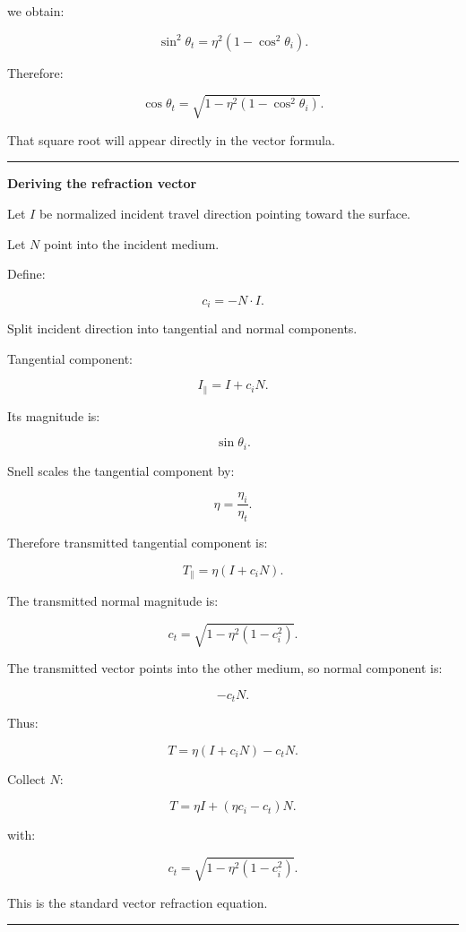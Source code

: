 we obtain:

\[
\sin^2\theta_t
=
\eta^2
(1-\cos^2\theta_i).
\]

Therefore:

\[
\boxed{
\cos\theta_t
=
\sqrt{
1-
\eta^2
(1-\cos^2\theta_i)
}.
}
\]

That square root will appear directly in the vector formula.

\begin{center}\rule{0.5\linewidth}{0.5pt}\end{center}

\textbf{Deriving the refraction vector}

Let \(I\) be normalized incident travel direction pointing toward the surface.

Let \(N\) point into the incident medium.

Define:

\[
c_i=-N\cdot I.
\]

Split incident direction into tangential and normal components.

Tangential component:

\[
I_\parallel
=
I+c_iN.
\]

Its magnitude is:

\[
\sin\theta_i.
\]

Snell scales the tangential component by:

\[
\eta=\frac{\eta_i}{\eta_t}.
\]

Therefore transmitted tangential component is:

\[
T_\parallel=
\eta(I+c_iN).
\]

The transmitted normal magnitude is:

\[
c_t=
\sqrt{
1-\eta^2(1-c_i^2)
}.
\]

The transmitted vector points into the other medium, so normal component is:

\[
-c_tN.
\]

Thus:

\[
T=
\eta(I+c_iN)-c_tN.
\]

Collect \(N\):

\[
\boxed{
T=
\eta I+
(\eta c_i-c_t)N.
}
\]

with:

\[
\boxed{
c_t=
\sqrt{
1-\eta^2(1-c_i^2)
}.
}
\]

This is the standard vector refraction equation.

\begin{center}\rule{0.5\linewidth}{0.5pt}\end{center}

